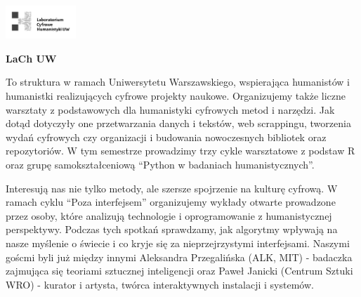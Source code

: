 \documentclass[\main/boa.tex]{subfiles}
\begin{document}
	
	\begin{minipage}[t]{0.915\textwidth}
		\center     
		\includegraphics[width=100px]{img/logos.bw/lach.png} 
	\end{minipage}
	
	\Large \textbf {LaCh UW}
	
	
	\vskip 0.3cm
	\normalsize 
	To struktura w ramach Uniwersytetu Warszawskiego, wspierająca humanistów i humanistki realizujących cyfrowe projekty naukowe. Organizujemy także liczne warsztaty z podstawowych dla humanistyki cyfrowych metod i narzędzi. Jak dotąd dotyczyły one przetwarzania danych i tekstów, web scrappingu, tworzenia wydań cyfrowych czy organizacji i budowania nowoczesnych bibliotek oraz repozytoriów. W tym semestrze prowadzimy trzy cykle warsztatowe z podstaw R oraz grupę samokształceniową “Python w badaniach humanistycznych”.
	
	Interesują nas nie tylko metody, ale szersze spojrzenie na kulturę cyfrową. W ramach cyklu “Poza interfejsem” organizujemy wykłady otwarte prowadzone przez osoby, które analizują technologie i oprogramowanie z humanistycznej perspektywy. Podczas tych spotkań sprawdzamy, jak algorytmy wpływają na nasze myślenie o świecie i co kryje się za nieprzejrzystymi interfejsami. Naszymi goścmi byli już między innymi Aleksandra Przegalińska (ALK, MIT) - badaczka zajmująca się teoriami sztucznej inteligencji oraz Paweł Janicki (Centrum Sztuki WRO) - kurator i artysta, twórca interaktywnych instalacji i systemów.
	
\end{document}
